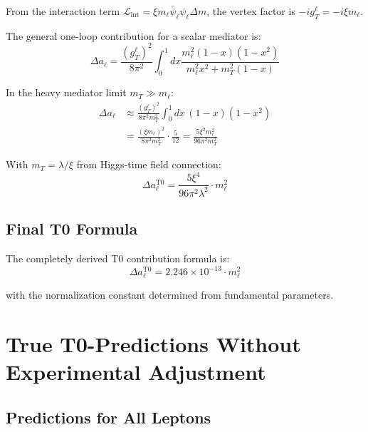 \documentclass[12pt,a4paper]{article}
\begin{document}
	\begin{derivation}
		From the interaction term $\mathcal{L}_{\mathrm{int}} = \xi m_\ell \bar{\psi}_\ell \psi_\ell \Delta m$, the vertex factor is $-i g_T^\ell = -i \xi m_\ell$.
		
		The general one-loop contribution for a scalar mediator is:
		\begin{equation}
			\Delta a_\ell = \frac{(g_T^\ell)^2}{8\pi^2} \int_0^1 dx \frac{m_\ell^2 (1-x)(1-x^2)}{m_\ell^2 x^2 + m_T^2 (1-x)}
		\end{equation}
		
		In the heavy mediator limit $m_T \gg m_\ell$:
		\begin{align}
			\Delta a_\ell &\approx \frac{(g_T^\ell)^2}{8\pi^2 m_T^2} \int_0^1 dx \, (1-x)(1-x^2) \\
			&= \frac{(\xi m_\ell)^2}{8\pi^2 m_T^2} \cdot \frac{5}{12} = \frac{5\xi^2 m_\ell^2}{96\pi^2 m_T^2}
		\end{align}
		
		With $m_T = \lambda/\xi$ from Higgs-time field connection:
		\begin{equation}
			\Delta a_\ell^{\mathrm{T0}} = \frac{5\xi^4}{96\pi^2\lambda^2} \cdot m_\ell^2
			\label{eq:t0_fundamental_formula}
		\end{equation}
	\end{derivation}
	
	\subsection{Final T0 Formula}
	
	\begin{keyresult}
		The completely derived T0 contribution formula is:
		\begin{equation}
			\Delta a_\ell^{\mathrm{T0}} = 2.246 \times 10^{-13} \cdot m_\ell^2
			\label{eq:final_t0_formula}
		\end{equation}
		
		with the normalization constant determined from fundamental parameters.
	\end{keyresult}
	
	\section{True T0-Predictions Without Experimental Adjustment}
	
	\subsection{Predictions for All Leptons}
	
\end{document}
